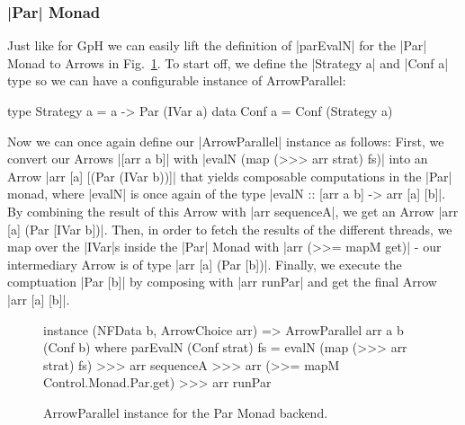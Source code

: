 \subsubsection{|Par| Monad}
Just like for GpH we can easily lift the definition of |parEvalN| for the |Par| Monad to Arrows in Fig.~\ref{fig:ArrowParallelParMonad}. To start off, we define the |Strategy a| and |Conf a| type so we can have a configurable instance of ArrowParallel:
\begin{code}
type Strategy a = a -> Par (IVar a)
data Conf a = Conf (Strategy a)
\end{code}
Now we can once again define our |ArrowParallel| instance as follows: First, we convert our Arrows |[arr a b]| with |evalN (map (>>> arr strat) fs)| into an Arrow |arr [a] [(Par (IVar b))]| that yields composable computations in the |Par| monad, where |evalN| is once again of the type |evalN :: [arr a b] -> arr [a] [b]|. By combining the result of this Arrow with |arr sequenceA|, we get an Arrow |arr [a] (Par [IVar b])|. Then, in order to fetch the results of the different threads, we map over the |IVar|s inside the |Par| Monad with |arr (>>= mapM get)| - our intermediary Arrow is of type |arr [a] (Par [b])|. Finally, we execute the comptuation |Par [b]| by composing with |arr runPar| and get the final Arrow |arr [a] [b]|.
\begin{figure}[h]
\begin{code}
instance (NFData b, ArrowChoice arr) => ArrowParallel arr a b (Conf b) where
    parEvalN (Conf strat) fs = evalN (map (>>> arr strat) fs) >>>
                    arr sequenceA >>>
                    arr (>>= mapM Control.Monad.Par.get) >>>
                    arr runPar
\end{code} %
\caption{ArrowParallel instance for the Par Monad backend.}
\label{fig:ArrowParallelParMonad}
\end{figure}

